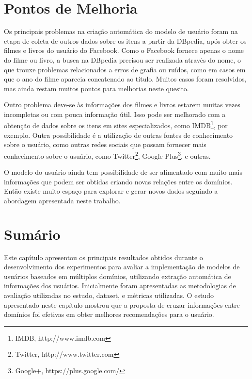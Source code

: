 \section{Pontos de Melhoria}

Os principais problemas na criação automática do modelo de usuário foram na etapa de coleta de outros dados sobre os itens a partir da DBpedia, após obter os filmes e livros do usuário do Facebook. Como o Facebook fornece apenas o nome do filme ou livro, a busca na DBpedia precisou ser realizada através do nome, o que trouxe problemas relacionados a erros de grafia ou ruídos, como em casos em que o ano do filme aparecia concatenado ao título. Muitos casos foram resolvidos, mas ainda restam muitos pontos para melhorias neste quesito.

Outro problema deve-se às informações dos filmes e livros estarem muitas vezes incompletas ou com pouca informação útil. Isso pode ser melhorado com a obtenção de dados sobre os itens em sites especializados, como IMDB\footnote{IMDB, http://www.imdb.com}, por exemplo. Outra possibilidade é a utilização de outras fontes de conhecimento sobre o usuário, como outras redes sociais que possam fornecer mais conhecimento sobre o usuário, como Twitter\footnote{Twitter, http://www.twitter.com}, Google Plus\footnote{Google+, https://plus.google.com/}, e outras.

O modelo do usuário ainda tem possibilidade de ser alimentado com muito mais informações que podem ser obtidas criando novas relações entre os domínios. Então existe muito espaço para explorar e gerar novos dados seguindo a abordagem apresentada neste trabalho.


\section{Sumário}

Este capítulo apresentou os principais resultados obtidos durante o desenvolvimento dos experimentos para avaliar a implementação de modelos de usuários baseados em múltiplos domínios, utilizando extração automática de informações dos usuários. Inicialmente foram apresentadas as metodologias de avaliação utilizadas no estudo, dataset, e métricas utilizadas. O estudo apresentado neste capítulo mostrou que a proposta de cruzar informações entre domínios foi efetivas em obter melhores recomendações para o usuário.